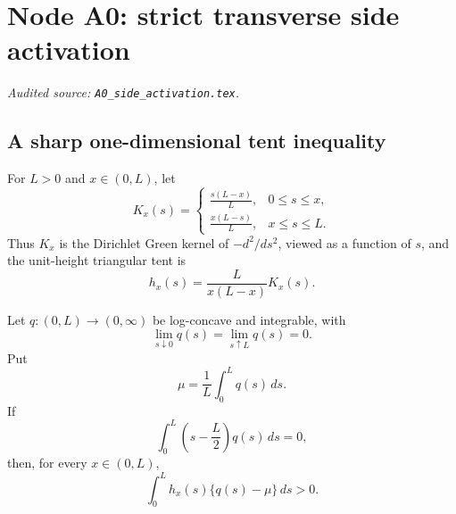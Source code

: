 \begingroup
\section{Node A0: strict transverse side activation}
\label{module:A0}
\noindent\textit{Audited source: \nolinkurl{A0_side_activation.tex}.}
\subsection{A sharp one-dimensional tent inequality}

For \(L>0\) and \(x\in(0,L)\), let
\begin{equation}\label{A0:eq:green}
 K_x(s)=
 \begin{cases}
  \displaystyle\frac{s(L-x)}{L},&0\le s\le x,\\[2mm]
  \displaystyle\frac{x(L-s)}{L},&x\le s\le L.
 \end{cases}
\end{equation}
Thus \(K_x\) is the Dirichlet Green kernel of \(-d^2/ds^2\), viewed as a
function of \(s\), and the unit-height triangular tent is
\begin{equation}\label{A0:eq:tent}
 h_x(s)=\frac{L}{x(L-x)}K_x(s).
\end{equation}

\begin{lemma}
\label{A0:lem:tent}
Let \(q:(0,L)\to(0,\infty)\) be log-concave and integrable, with
\begin{equation}\label{A0:eq:endpoint}
 \lim_{s\downarrow0}q(s)=\lim_{s\uparrow L}q(s)=0.
\end{equation}
Put
\begin{equation}
 \mu=\frac1L\int_0^Lq(s)\,ds.
\end{equation}
If
\begin{equation}\label{A0:eq:barycenter}
 \int_0^L\left(s-\frac L2\right)q(s)\,ds=0,
\end{equation}
then, for every \(x\in(0,L)\),
\begin{equation}\label{A0:eq:tent-positive}
 \boxed{\int_0^Lh_x(s)\{q(s)-\mu\}\,ds>0.}
\end{equation}
\end{lemma}

